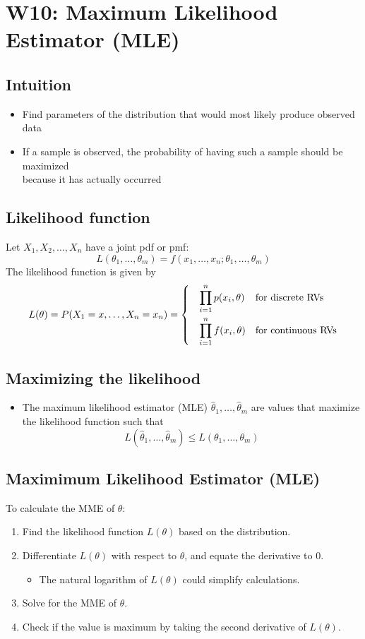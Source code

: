 \documentclass[a4paper]{article}
\begin{document}
\section{W10: Maximum Likelihood Estimator (MLE)}
\subsection{Intuition}
\begin{itemize}
    \item Find parameters of the distribution that would most likely produce observed data
    \item If a sample is observed, the probability of having such a sample should be maximized \\because it has actually occurred
\end{itemize}
\subsection{Likelihood function}
Let $X_{1}, X_{2}, \ldots , X_{n}$ have a joint pdf or pmf:
$$L(\theta_{1}, \ldots, \theta_{m}) = f(x_{1}, \ldots, x_{n}; \theta_{1}, \ldots, \theta_{m})$$
The likelihood function is given by
\begin{align*}
    L(\theta) = P(X_{1}=x, \ldots, X_{n}=x_{n}) = \begin{dcases}
    \quad \prod_{i=1}^{n} p(x_{i}, \theta) &\mbox{for discrete RVs}\\
    \quad \prod_{i=1}^{n} f(x_{i}, \theta) &\mbox{for continuous RVs}
    \end{dcases}
\end{align*}
\subsection{Maximizing the likelihood}
\begin{itemize}
    \item The maximum likelihood estimator (MLE) $\hat{\theta}_{1}, \ldots, \hat{\theta}_{m}$ are values that maximize the likelihood function such that
    $$L(\hat{\theta}_{1}, \ldots, \hat{\theta}_{m})\leq L(\theta_{1}, \ldots, \theta_{m})
    $$
\end{itemize}
\subsection{Maximimum Likelihood Estimator (MLE)}
To calculate the MME of $\theta$:
\begin{enumerate}
    \item Find the likelihood function $L(\theta)$ based on the distribution.
    \item Differentiate $L(\theta)$ with respect to $\theta$, and equate the derivative to 0.
    \begin{itemize}[label=$\circ$]
        \item The natural logarithm of $L(\theta)$ could simplify calculations.
    \end{itemize}
    \item Solve for the MME of $\theta$.
    \item Check if the value is maximum by taking the second derivative of $L(\theta)$.
\end{enumerate}
\newpage
\end{document}
